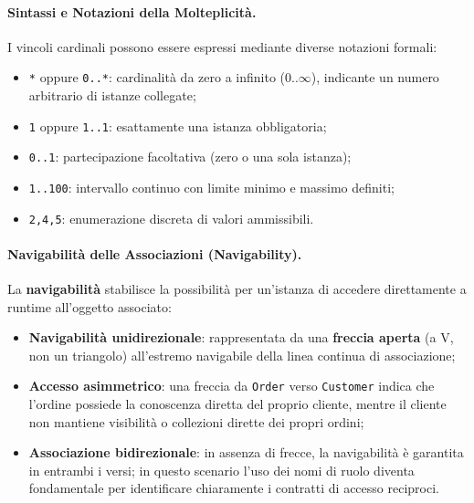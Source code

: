 \documentclass[12pt]{extarticle}
\newcommand{\cn}[1]{\makebox[\linewidth][c]{\textbf{#1}}}
\begin{document}
\paragraph{Sintassi e Notazioni della Molteplicità.}
I vincoli cardinali possono essere espressi mediante diverse notazioni formali:
\begin{itemize}
    \item \texttt{*} oppure \texttt{0..*}: cardinalità da zero a infinito ($0..\infty$), indicante un numero arbitrario di istanze collegate;
    \item \texttt{1} oppure \texttt{1..1}: esattamente una istanza obbligatoria;
    \item \texttt{0..1}: partecipazione facoltativa (zero o una sola istanza);
    \item \texttt{1..100}: intervallo continuo con limite minimo e massimo definiti;
    \item \texttt{2,4,5}: enumerazione discreta di valori ammissibili.
\end{itemize}

\begin{figure}[htbp]
    \centering
{}
    \label{fig:multiplicity_order_customer}
\end{figure}

\paragraph{Navigabilità delle Associazioni (Navigability).}
La \textbf{navigabilità} stabilisce la possibilità per un'istanza di accedere direttamente a runtime all'oggetto associato:
\begin{itemize}
    \item \textbf{Navigabilità unidirezionale}: rappresentata da una \textbf{freccia aperta} (a V, non un triangolo) all'estremo navigabile della linea continua di associazione;
    \item \textbf{Accesso asimmetrico}: una freccia da \texttt{Order} verso \texttt{Customer} indica che l'ordine possiede la conoscenza diretta del proprio cliente, mentre il cliente non mantiene visibilità o collezioni dirette dei propri ordini;
    \item \textbf{Associazione bidirezionale}: in assenza di frecce, la navigabilità è garantita in entrambi i versi; in questo scenario l'uso dei nomi di ruolo diventa fondamentale per identificare chiaramente i contratti di accesso reciproci.
\end{itemize}
\end{document}
